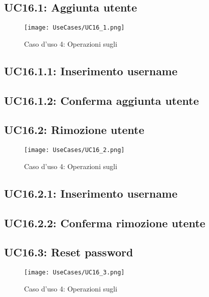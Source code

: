 \documentclass{scalatekids-article}
\begin{document}
\subsection{UC16.1: Aggiunta utente}

\begin{figure}[H]
  \begin{center}
    \texttt{[image: UseCases/UC16\_1.png]}
    \caption*{Caso d'uso 4: Operazioni sugli }
  \end{center}
\end{figure}

\subsection{UC16.1.1: Inserimento username}

\subsection{UC16.1.2: Conferma aggiunta utente}

\subsection{UC16.2: Rimozione utente}

\begin{figure}[H]
  \begin{center}
    \texttt{[image: UseCases/UC16\_2.png]}
    \caption*{Caso d'uso 4: Operazioni sugli }
  \end{center}
\end{figure}

\subsection{UC16.2.1: Inserimento username}

\subsection{UC16.2.2: Conferma rimozione utente}

\subsection{UC16.3: Reset password}

\begin{figure}[H]
  \begin{center}
    \texttt{[image: UseCases/UC16\_3.png]}
    \caption*{Caso d'uso 4: Operazioni sugli }
  \end{center}
\end{figure}
\end{document}
